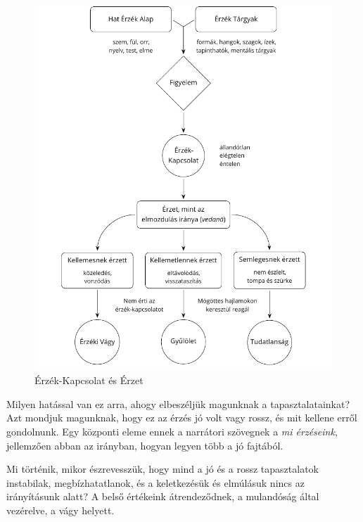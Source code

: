 \begin{figure}[h]
\caption{Érzék-Kapcsolat és Érzet}\label{fig-sense-contact-feeling}
\bigskip
\includegraphics[width=\linewidth]{./manuscript/tex/diagrams/sense-contact-feeling-hu.pdf}
\end{figure}

\clearpage
\normalpagelayout

\vspace*{-\baselineskip}


Milyen hatással van ez arra, ahogy elbeszéljük magunknak a
tapasztalatainkat? Azt mondjuk magunknak, hogy ez az érzés jó volt vagy
rossz, és mit kellene erről gondolnunk. Egy központi eleme ennek a
narrátori szövegnek a \emph{mi érzéseink}, jellemzően abban az irányban,
hogyan legyen több a jó fajtából.

Mi történik, mikor észrevesszük, hogy mind a jó és a rossz tapasztalatok
instabilak, megbízhatatlanok, és a keletkezésük és elmúlásuk nincs az
irányításunk alatt? A belső értékeink átrendeződnek, a mulandóság által
vezérelve, a vágy helyett.

